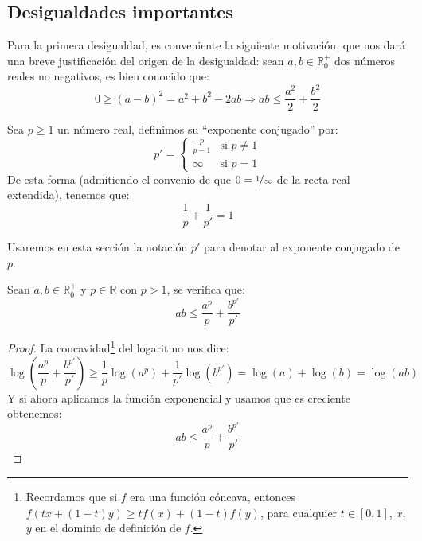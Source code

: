 \subsection{Desigualdades importantes}
Para la primera desigualdad, es conveniente la siguiente motivación, que nos dará una breve justificación del origen de la desigualdad: sean $a,b\in \mathbb{R}^+_0$ dos números reales no negativos, es bien conocido que:
\begin{equation*}
    0 \geq {(a-b)}^{2} = a^2 + b^2 - 2ab \Longrightarrow ab \leq \dfrac{a^2}{2} + \dfrac{b^2}{2}
\end{equation*}

\begin{definicion}
    Sea $p\geq 1$ un número real, definimos su ``exponente conjugado'' por:
    \begin{equation*}
        p' = \left\{\begin{array}{ll}
                \frac{p}{p-1} & \text{si\ } p\neq 1 \\
                \infty & \text{si\ } p = 1
        \end{array}\right.
    \end{equation*}
    De esta forma (admitiendo el convenio de que $0 = \nicefrac{1}{\infty}$ de la recta real extendida), tenemos que:
    \begin{equation*}
        \dfrac{1}{p} + \dfrac{1}{p'} = 1
    \end{equation*}
\end{definicion}
\noindent
Usaremos en esta sección la notación $p'$ para denotar al exponente conjugado de $p$.

\begin{prop}
    Sean $a,b\in \mathbb{R}^+_0$ y $p\in \mathbb{R}$ con $p>1$, se verifica que:
    \begin{equation*}
        ab \leq \dfrac{a^p}{p} + \dfrac{b^{p'}}{p'}
    \end{equation*}
    \begin{proof}
        La concavidad\footnote{Recordamos que si $f$ era una función cóncava, entonces $f(tx+(1-t)y) \geq tf(x)+(1-t)f(y)$, para cualquier $t\in [0,1]$, $x$,$y$ en el dominio de definición de $f$.} del logaritmo nos dice:
        \begin{equation*}
            \log\left(\dfrac{a^p}{p} + \dfrac{b^{p'}}{p'}\right) \geq \dfrac{1}{p}\log(a^p) + \dfrac{1}{p'}\log\left(b^{p'}\right) = \log(a) + \log(b) = \log(ab)
        \end{equation*}
        Y si ahora aplicamos la función exponencial y usamos que es creciente obtenemos:
        \begin{equation*}
            ab \leq \dfrac{a^p}{p} + \dfrac{b^{p'}}{p'}
        \end{equation*}
    \end{proof}
\end{prop}

